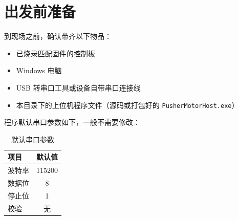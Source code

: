 \section*{出发前准备}

到现场之前，确认带齐以下物品：

\begin{itemize}
    \item 已烧录匹配固件的控制板
    \item Windows 电脑
    \item USB 转串口工具或设备自带串口连接线
    \item 本目录下的上位机程序文件（源码或打包好的 \texttt{PusherMotorHost.exe}）
\end{itemize}

程序默认串口参数如下，一般不需要修改：

\begin{table}[H]
    \centering
    \caption{默认串口参数}
    \label{tab:default-serial}
    \begin{tabular}{lc}
        \toprule
        \textbf{项目} & \textbf{默认值} \\
        \midrule
        波特率 & 115200 \\
        数据位 & 8 \\
        停止位 & 1 \\
        校验 & 无 \\
        \bottomrule
    \end{tabular}
\end{table}
